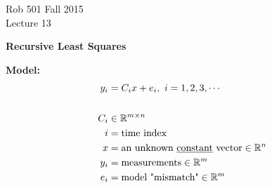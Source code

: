 \documentclass[letterpaper]{article}
\newcommand{\real}{\mathbb R}  %
\begin{document}
\baselineskip=48pt  %


\setlength{\parskip}{.3in}
\setlength{\itemsep}{.3in}

\pagestyle{plain}

{\Large \bf
\begin{center}
Rob 501 Fall 2015\\
Lecture 13\\
\end{center}
}

\Large

\begin{center}
    \textbf{Recursive Least Squares}
\end{center}
\textbf{Model:}
    \begin{align*}
        y_i&=C_ix+e_i,\ i=1, 2, 3, \dotsb\\
        \\
        C_i& \in \real^{m \times n}\\
        i&=\textnormal{time index}\\
        x&=\textnormal{an unknown \underline{constant} vector} \in \real^n\\
        y_i&=\textnormal{measurements} \in \real^m\\
        e_i&=\textnormal{model "mismatch"} \in \real^m
    \end{align*}
\end{document}

